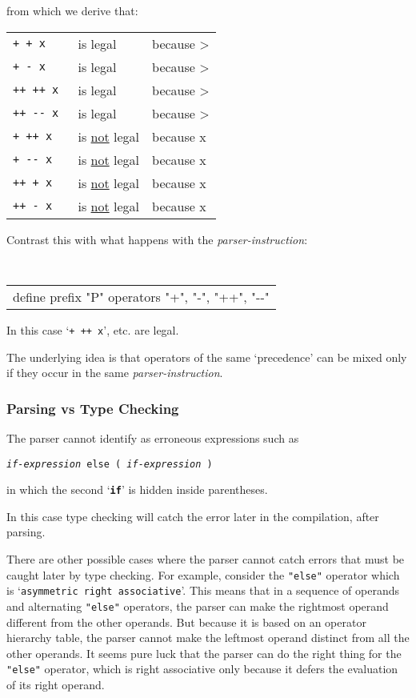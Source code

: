 \documentclass[12pt]{article}
\newcommand{\TT}[1]{{\tt \bfseries #1}}
\begin{document}
from which we derive that:
\begin{center}
\begin{tabular}{lll}
\tt + + x	& is legal & because \RX{+} > \RX{+} \\
\tt + - x	& is legal & because \RX{+} > \RX{-} \\
\tt ++ ++ x	& is legal & because \RX{++} > \RX{++} \\
\tt ++ -{}- x	& is legal & because \RX{++} > \RX{-{}-} \\
\tt + ++ x	& is \underline{not} legal & because \RX{+} x \RX{++} \\
\tt + -{}- x	& is \underline{not} legal & because \RX{+} x \RX{-{}-} \\
\tt ++ + x	& is \underline{not} legal & because \RX{++} x \RX{+} \\
\tt ++ - x	& is \underline{not} legal & because \RX{++} x \RX{-} \\
\end{tabular}
\end{center}

Contrast this with what happens with the {\em parser-instruction}:
\begin{center}
\tt
\begin{tabular}{l}
define prefix "P" operators "+", "-", "++", "-{}-"  \\
\end{tabular}
\end{center}
In this case `{\tt + ++ x}', etc. are legal.

The underlying idea is that operators of the same `precedence' can be
mixed only if they occur in the same {\em parser-instruction}.

\subsubsection{Parsing vs Type Checking}

The parser cannot identify as erroneous expressions such as
\begin{center}
\tt {\em if-expression} else ( {\em if-expression} )
\end{center}
in which the second `\TT{if}' is hidden inside parentheses.

In this case type checking will catch the error later in the
compilation, after parsing.

There are other possible cases where the parser cannot catch
errors that must be caught later by type checking.
For example, consider the {\tt "else"} operator
which is `{\tt asymmetric right associative}'.  This means
that in a sequence of operands and alternating {\tt "else"}
operators, the parser can make the rightmost operand different
from the other operands.  But because it is based on an
operator hierarchy table, the parser cannot
make the leftmost operand distinct from all the other operands.
It seems pure luck that the parser can do the right thing
for the {\tt "else"} operator, which is right associative only
because it defers the evaluation of its right operand.
\end{document}
